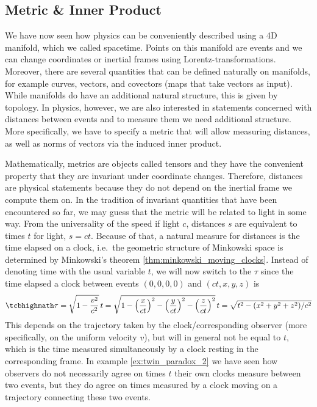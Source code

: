 		\subsection{Metric \& Inner Product}
We have now seen how physics can be conveniently described using a 4D manifold, which we called spacetime. Points on this manifold are events and we can change coordinates or inertial frames using Lorentz-transformations. Moreover, there are several quantities that can be defined naturally on manifolds, for example curves, vectors, and covectors (maps that take vectors as input). While manifolds do have an additional natural structure, this is given by topology. In physics, however, we are also interested in statements concerned with distances between events and to measure them we need additional structure. More specifically, we have to specify a metric that will allow measuring distances, as well as norms of vectors via the induced inner product.


Mathematically, metrics are objects called tensors and they have the convenient property that they are invariant under coordinate changes. Therefore, distances are physical statements because they do not depend on the inertial frame we compute them on. In the tradition of invariant quantities that have been encountered so far, we may guess that the metric will be related to light in some way. From the universality of the speed if light $c$, distances $s$ are equivalent to times $t$ for light, $s = c t$. Because of that, a natural measure for distances is the time elapsed on a clock, i.e.~the geometric structure of Minkowski space is determined by Minkowski's theorem \ref{thm:minkowski_moving_clocks}. Instead of denoting time with the usual variable $t$, we will now switch to the  $\tau$ since the time elapsed a clock between events $(0, 0, 0, 0)$ and $(ct, x, y, z)$ is
\begin{equation}\label{eq:proper_time_uniform}
\eqbox{
\tau = \sqrt{1 - \frac{v^2}{c^2}} \, t = \sqrt{1 - \qty(\frac{x}{ct})^2 - \qty(\frac{y}{ct})^2 - \qty(\frac{z}{ct})^2} \, t = \sqrt{t^2 - (x^2 + y^2 + z^2) / c^2}
}
\end{equation}
This depends on the trajectory taken by the clock/corresponding observer (more specifically, on the uniform velocity $v$), but will in general not be equal to $t$, which is the time measured simultaneously by a clock resting in the corresponding frame. In example \ref{ex:twin_paradox_2} we have seen how observers do not necessarily agree on times $t$ their own clocks measure between two events, but they do agree on times measured by a clock moving on a trajectory connecting these two events.


